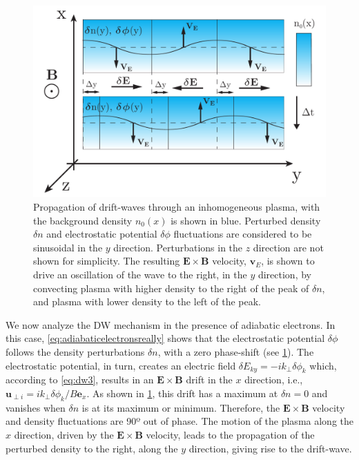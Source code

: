 \begin{figure}
    \centering
    \includegraphics[width=.8\textwidth]{images/drift_wave_diagram.pdf}
    \caption{Propagation of drift-waves through an inhomogeneous plasma, with the background density $n_0(x)$ is shown in blue. Perturbed density $\delta n$ and electrostatic potential $\delta \phi$ fluctuations are considered to be sinusoidal in the $y$ direction. Perturbations in the $z$ direction are not shown for simplicity. The resulting $\mathbf E \times \mathbf B$ velocity, $\mathbf v_E$, is shown to drive an oscillation of the wave to the right, in the $y$ direction, by convecting plasma with higher density to the right of the peak of $\delta n$, and plasma with lower density to the left of the peak.}
    \label{fig:dwfig}
\end{figure}

We now analyze the DW mechanism in the presence of adiabatic electrons.
%
In this case, \cref{eq:adiabaticelectronsreally} shows that the electrostatic potential $\delta \phi$ follows the density perturbations $\delta n$, with a zero phase-shift (see \cref{fig:dwfig}).
%
The electrostatic potential, in turn, creates an electric field $\delta E_{ky} = - i k_\perp \delta \phi_k$ which, according to \cref{eq:dw3}, results in an $\mathbf E \times \mathbf B$ drift in the $x$ direction, i.e., $\mathbf u_{\perp i} = {i k_\perp \delta\phi_k}/B\mathbf e_x$.
%
As shown in \cref{fig:dwfig}, this drift has a maximum at $\delta n=0$ and vanishes when $\delta n$ is at its maximum or minimum.
%
Therefore, the $\mathbf E \times \mathbf B$ velocity and density fluctuations are 90º out of phase.
%
The motion of the plasma along the $x$ direction, driven by the $\mathbf E \times \mathbf B$ velocity, leads to the propagation of the perturbed density to the right, along the $y$ direction, giving rise to the drift-wave.

